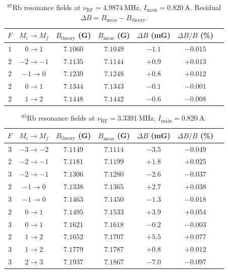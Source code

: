\begin{table}[ht]
  \centering
  \caption{$^{87}$Rb resonance fields at
    $\nu_{\mathrm{RF}} = \SI{4.9874}{\mega\hertz}$,
    $I_{\mathrm{main}} = \SI{0.820}{\ampere}$. Residual
    $\Delta B = B_{\mathrm{meas}} - B_{\mathrm{theory}}$.}
  \label{tab:4c_rb87}
  \begin{tabular}{ccccccc}
    \toprule
    $F$ & $M_i \to M_f$ & $B_{\mathrm{theory}}$ (G) &
    $B_{\mathrm{meas}}$ (G) & $\Delta B$ (mG) & $\Delta B / B$ (\%) \\
    \midrule
    $1$ & $0 \to 1$   & $7.1060$ & $7.1049$ & $-1.1$ & $-0.015$ \\
    $2$ & $-2 \to -1$ & $7.1135$ & $7.1144$ & $+0.9$ & $+0.013$ \\
    $2$ & $-1 \to 0$  & $7.1239$ & $7.1248$ & $+0.8$ & $+0.012$ \\
    $2$ & $0 \to 1$   & $7.1344$ & $7.1343$ & $-0.1$ & $-0.001$ \\
    $2$ & $1 \to 2$   & $7.1448$ & $7.1442$ & $-0.6$ & $-0.008$ \\
    \bottomrule
  \end{tabular}
\end{table}

\begin{table}[ht]
  \centering
  \caption{$^{85}$Rb resonance fields at
    $\nu_{\mathrm{RF}} = \SI{3.3391}{\mega\hertz}$,
    $I_{\mathrm{main}} = \SI{0.820}{\ampere}$.}
  \label{tab:4c_rb85}
  \begin{tabular}{ccccccc}
    \toprule
    $F$ & $M_i \to M_f$ & $B_{\mathrm{theory}}$ (G) &
    $B_{\mathrm{meas}}$ (G) & $\Delta B$ (mG) & $\Delta B / B$ (\%) \\
    \midrule
    $3$ & $-3 \to -2$ & $7.1149$ & $7.1114$ & $-3.5$ & $-0.049$ \\
    $2$ & $-2 \to -1$ & $7.1181$ & $7.1199$ & $+1.8$ & $+0.025$ \\
    $3$ & $-2 \to -1$ & $7.1306$ & $7.1280$ & $-2.6$ & $-0.037$ \\
    $2$ & $-1 \to 0$  & $7.1338$ & $7.1365$ & $+2.7$ & $+0.038$ \\
    $3$ & $-1 \to 0$  & $7.1463$ & $7.1450$ & $-1.3$ & $-0.018$ \\
    $2$ & $0 \to 1$   & $7.1495$ & $7.1533$ & $+3.9$ & $+0.054$ \\
    $3$ & $0 \to 1$   & $7.1621$ & $7.1618$ & $-0.2$ & $-0.003$ \\
    $2$ & $1 \to 2$   & $7.1652$ & $7.1707$ & $+5.5$ & $+0.077$ \\
    $3$ & $1 \to 2$   & $7.1779$ & $7.1787$ & $+0.8$ & $+0.012$ \\
    $3$ & $2 \to 3$   & $7.1937$ & $7.1867$ & $-7.0$ & $-0.097$ \\
    \bottomrule
  \end{tabular}
\end{table}

